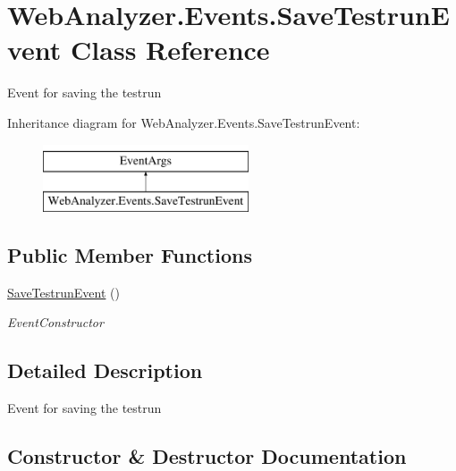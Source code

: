 \hypertarget{class_web_analyzer_1_1_events_1_1_save_testrun_event}{}\section{Web\+Analyzer.\+Events.\+Save\+Testrun\+Event Class Reference}
\label{class_web_analyzer_1_1_events_1_1_save_testrun_event}


Event for saving the testrun  


Inheritance diagram for Web\+Analyzer.\+Events.\+Save\+Testrun\+Event\+:\begin{figure}[H]
\begin{center}
\leavevmode
\includegraphics[height=2.000000cm]{class_web_analyzer_1_1_events_1_1_save_testrun_event}
\end{center}
\end{figure}
\subsection*{Public Member Functions}
\begin{DoxyCompactItemize}
\item 
\hyperlink{class_web_analyzer_1_1_events_1_1_save_testrun_event_a1ebb2ecd565835e01006958dc3a2bcb6}{Save\+Testrun\+Event} ()
\begin{DoxyCompactList}\small\item\em Event\+Constructor \end{DoxyCompactList}\end{DoxyCompactItemize}


\subsection{Detailed Description}
Event for saving the testrun 



\subsection{Constructor \& Destructor Documentation}
\hypertarget{class_web_analyzer_1_1_events_1_1_save_testrun_event_a1ebb2ecd565835e01006958dc3a2bcb6}{}
